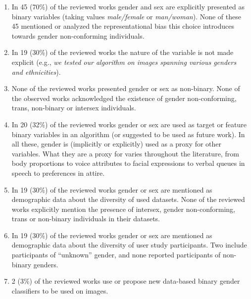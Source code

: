\documentclass[nonacm,sigconf,balance=false]{acmart}
\begin{document}
\begin{enumerate}[O1.]
    \item In 45 (70\%) of the reviewed works gender and sex are explicitly presented as binary variables (taking values \emph{male/female} or \emph{man/woman}). None of these 45 mentioned or analyzed the representational bias this choice introduces towards gender non-conforming individuals.
    \item In 19 (30\%) of the reviewed works the nature of the variable is not made explicit (e.g., \emph{we tested our algorithm on images spanning various genders and ethnicities}).
    \item None of the reviewed works presented gender or sex as non-binary. None of the observed works acknowledged the existence of gender non-conforming, trans, non-binary or intersex individuals.
    \item In 20 (32\%) of the reviewed works gender or sex are used as target or feature binary variables in an algorithm (or suggested to be used as future work). In all these, gender is (implicitly or explicitly) used as a proxy for other variables. What they are a proxy for varies throughout the literature, from body proportions to voice attributes to facial expressions to verbal queues in speech to preferences in attire.
    \item In 19 (30\%) of the reviewed works gender or sex are mentioned as demographic data about the diversity of used datasets. None of the reviewed works explicitly mention the presence of intersex, gender non-conforming, trans or non-binary individuals in their datasets.
    \item In 19 (30\%) of the reviewed works gender or sex are mentioned as demographic data about the diversity of user study participants. Two include participants of ``unknown'' gender, and none reported participants of non-binary genders.
    \item 2 (3\%) of the reviewed works use or propose new data-based binary gender classifiers to be used on images.
\end{enumerate}
\end{document}

